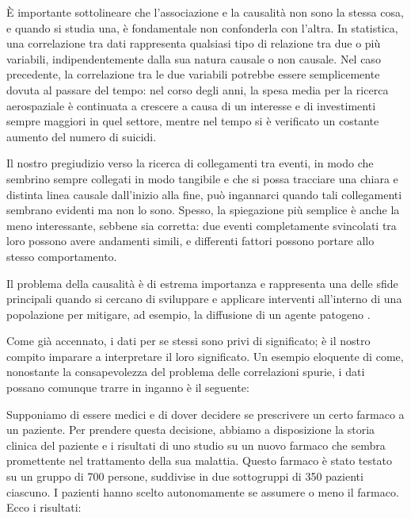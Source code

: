 È importante sottolineare che l'associazione e la causalità non sono 
la stessa cosa, e quando si studia una, è fondamentale non confonderla 
con l'altra. In statistica, una correlazione tra dati rappresenta 
qualsiasi tipo di relazione tra due o più variabili, indipendentemente 
dalla sua natura causale o non causale. Nel caso precedente, 
la correlazione tra le due variabili potrebbe essere semplicemente 
dovuta al passare del tempo: nel corso degli anni, la spesa media per 
la ricerca aerospaziale è continuata a crescere a causa di un interesse 
e di investimenti sempre maggiori in quel settore, mentre nel tempo 
si è verificato un costante aumento del numero di suicidi.

Il nostro pregiudizio verso la ricerca di collegamenti tra eventi, 
in modo che sembrino sempre collegati in modo tangibile e che si 
possa tracciare una chiara e distinta linea causale dall'inizio alla 
fine, può ingannarci quando tali collegamenti sembrano evidenti ma 
non lo sono. Spesso, la spiegazione più semplice è anche la meno 
interessante, sebbene sia corretta: due eventi completamente svincolati 
tra loro possono avere andamenti simili, e differenti fattori possono 
portare allo stesso comportamento. 

Il problema della causalità è di estrema importanza e rappresenta 
una delle sfide principali quando si cercano di sviluppare e 
applicare interventi all'interno di una popolazione per mitigare, 
ad esempio, la diffusione di un agente patogeno \cite{Parascandola2001-kw}.

Come già accennato, i dati per se stessi sono privi di significato; 
è il nostro compito imparare a interpretare il loro significato. 
Un esempio eloquente di come, nonostante la consapevolezza del problema 
delle correlazioni spurie, i dati possano comunque trarre in inganno 
è il seguente:

Supponiamo di essere medici e di dover decidere se prescrivere un 
certo farmaco a un paziente. Per prendere questa decisione, abbiamo 
a disposizione la storia clinica del paziente e i risultati di uno 
studio su un nuovo farmaco che sembra promettente nel trattamento 
della sua malattia. Questo farmaco è stato testato su un gruppo di 
700 persone, suddivise in due sottogruppi di 350 pazienti ciascuno. 
I pazienti hanno scelto autonomamente se assumere o meno il farmaco.
Ecco i risultati:

